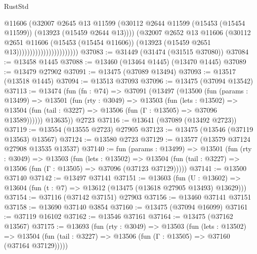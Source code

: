 \begin{lexlean}{RustStd}
\begin{coremodule}
                                          @11606
                                          (@32007
                                            @2645
                                            @13
                                            @11599
                                            (@30112
                                              @2644
                                              @11599
                                              (@15453 (@15454 @11599))
                                              (@13923 (@15459 @2644 @13))))
                                          (@32007
                                            @2652
                                            @13
                                            @11606
                                            (@30112
                                              @2651
                                              @11606
                                              (@15453 (@15454 @11606))
                                              (@13923 (@15459 @2651 @13)))))))))))))))))))))))
@37083 := @31449 (@31474 (@31515 @37080))
@37084 := @13458 @1445
@37088 := @13460 (@13464 @1445) (@13470 @1445)
@37089 := @13479 @27902
@37091 := @13475 (@37089 @13494)
@37093 := @13517 (@13518 @1445)
@37094 := @13513 @37093
@37096 := @13475 (@37094 @13542)
@37113 := @13474
    (fun (fn : @74) =>
    @37091
      (@13497
        (@13500
          (fun (params : @13499) =>
          @13501
            (fun (rty : @3049) =>
            @13503
              (fun (lets : @13502) =>
              @13504 (fun (tail : @3227) => @13506 (fun (Γ : @13505) => @37096 @13589))))))
        @13635))
    @2723
@37116 := @13641 (@37089 (@13492 @2723))
@37119 := @13554 (@13555 @2723) @27905
@37123 := @13475 (@13546 (@37119 @13563) @13567)
@37124 := @13580 @2723
@37129 := @13577 (@13579 @37124 @27908 @13535 @13537)
@37140 := fun (params : @13499) =>
  @13501
    (fun (rty : @3049) =>
    @13503
      (fun (lets : @13502) =>
      @13504 (fun (tail : @3227) => @13506 (fun (Γ : @13505) => @37096 (@37123 @37129)))))
@37141 := @13500 @37140
@37142 := @13497 @37141
@37151 := @13603
    (fun (U : @13602) => @13604 (fun (t : @7) => @13612 (@13475 (@13618 @27905 @13493) @13629)))
@37154 := @37116 (@37142 @37151) @27903
@37156 := @13460 @37141 @37151
@37158 := @13690 @37140 @3854
@37160 := @13475 (@37094 @16099)
@37161 := @37119 @16102
@37162 := @13546 @37161
@37164 := @13475 (@37162 @13567)
@37175 := @13693
    (fun (rty : @3049) =>
    @13503
      (fun (lets : @13502) =>
      @13504 (fun (tail : @3227) => @13506 (fun (Γ : @13505) => @37160 (@37164 @37129)))))

\end{coremodule}
\end{lexlean}
